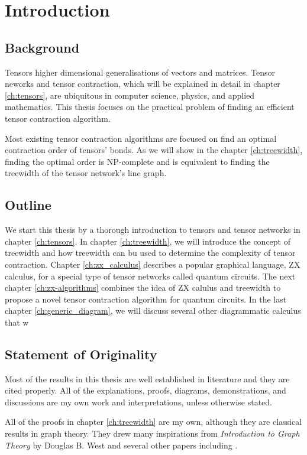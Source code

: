 \chapter{Introduction}

\section{Background}

Tensors higher dimensional generalisations of vectors and matrices.
Tensor neworks and tensor contraction, which will be explained in detail in chapter \ref{ch:tensors}, are ubiquitous in computer science, physics, and applied mathematics.
This thesis focuses on the practical problem of finding an efficient tensor contraction algorithm.

Most existing tensor contraction algorithms are focused on find an optimal contraction order of tensors' bonds.
As we will show in the chapter \ref{ch:treewidth}, finding the optimal order is NP-complete and is equivalent to finding the treewidth of the tensor network's line graph.

\section{Outline}

We start this thesis by a thorough introduction to tensors and tensor networks in chapter \ref{ch:tensors}.
In chapter \ref{ch:treewidth}, we will introduce the concept of treewidth and how treewidth can bu used to determine the complexity of tensor contraction.
Chapter \ref{ch:zx_calculus} describes a popular graphical language, ZX calculus, for a special type of tensor networks called quantum circuits. 
The next chapter \ref{ch:zx-algorithms} combines the idea of ZX calulus and treewidth to propose a novel tensor contraction algorithm for quantum circuits.
In the last chapter \ref{ch:generic_diagram}, we will discuss several other diagrammatic calculus that w

\section{Statement of Originality}

Most of the results in this thesis are well established in literature and they are cited properly. 
All of the explanations, proofs, diagrams, demonstrations, and discussions are my own work and interpretations, unless otherwise stated.

All of the proofs in chapter \ref{ch:treewidth} are my own, although they are classical results in graph theory.
They drew many inspirations from \textit{Introduction to Graph Theory} by Douglas B. West \cite{west2001introduction} and several other papers including
\cite{dirac1961rigid,fulkerson1965incidence,rose1970triangulated,gavril1974intersection}.

